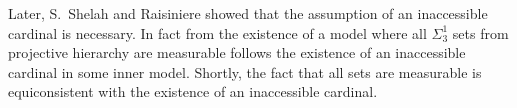 Later, S.~Shelah and Raisiniere showed that the assumption
of an inaccessible cardinal is necessary. In fact from the existence of a model
where all $\Sigma_3^1$ sets from projective hierarchy are
measurable follows the existence of an inaccessible cardinal
in some inner model. Shortly, the fact that all sets are measurable
is equiconsistent with the existence of an inaccessible cardinal.


